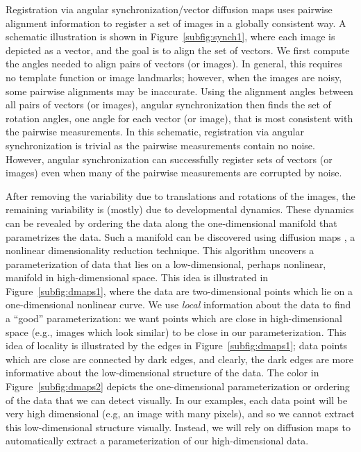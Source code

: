 \documentclass{pnastwo}
\begin{document}
\begin{article}
Registration via angular synchronization/vector diffusion maps uses pairwise alignment information to register a set of images in a globally consistent way.
%
A schematic illustration is shown in Figure~\ref{subfig:synch1}, where each image is depicted as a vector, and the goal is to align the set of vectors. 
%
We first compute the angles needed to align pairs of vectors (or images).
%
In general, this requires no template function or image landmarks; however, when the images are noisy, some pairwise alignments may be inaccurate.
%
Using the alignment angles between all pairs of vectors (or images), angular synchronization then finds the set of rotation angles, one angle for each vector (or image), that is most consistent with the pairwise measurements. 
%
In this schematic, registration via angular synchronization is trivial as the pairwise measurements contain no noise. 
%
However, angular synchronization can successfully register sets of vectors (or images) even when many of the pairwise measurements are corrupted by noise. 
%

%
After removing the variability due to translations and rotations of the images, the remaining variability is (mostly) due to developmental dynamics.
% 
These dynamics can be revealed by ordering the data along the one-dimensional manifold that parametrizes the data. 
%
Such a manifold can be discovered using diffusion maps \cite{coifman2005geometric}, a nonlinear dimensionality reduction technique.
%
This algorithm uncovers a parameterization of data that lies on a low-dimensional, perhaps nonlinear, manifold in high-dimensional space. 
%
This idea is illustrated in Figure~\ref{subfig:dmaps1}, where the data are two-dimensional points which lie on a one-dimensional nonlinear curve. 
%
We use {\it local} information about the data to find a ``good'' parameterization: we want points which are close in high-dimensional space (e.g., images which look similar) to be close in our parameterization.
%
This idea of locality is illustrated by the edges in Figure~\ref{subfig:dmaps1}; data points which are close are connected by dark edges, and clearly, the dark edges are more informative about the low-dimensional structure of the data. 
%
The color in Figure~\ref{subfig:dmaps2} depicts the one-dimensional parameterization or ordering of the data that we can detect visually.
%
In our examples, each data point will be very high dimensional (e.g, an image with many pixels), and so we cannot extract this low-dimensional structure visually.
%
Instead, we will rely on diffusion maps to automatically extract a parameterization of our high-dimensional data.
%


\end{article}
\end{document}
